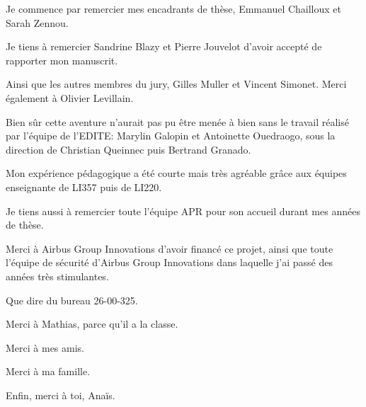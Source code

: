 

Je commence par remercier mes encadrants de thèse, Emmanuel Chailloux et Sarah
Zennou.


Je tiens à remercier Sandrine Blazy et Pierre Jouvelot d'avoir accepté de
rapporter mon manuscrit.


Ainsi que les autres membres du jury, Gilles Muller et Vincent Simonet.
Merci également à Olivier Levillain.


Bien sûr cette aventure n'aurait pas pu être menée à bien sans le travail
réalisé par l'équipe de l'EDITE: Marylin Galopin et Antoinette Ouedraogo, sous
la direction de Christian Queinnec puis Bertrand Granado.


Mon expérience pédagogique a été courte mais très agréable grâce aux équipes
enseignante de LI357 puis de LI220.


Je tiens aussi à remercier toute l'équipe APR pour son accueil durant mes années
de thèse.


Merci à Airbus Group Innovations d'avoir financé ce projet, ainsi que toute
l'équipe de sécurité d'Airbus Group Innovations dans laquelle j'ai passé des
années très stimulantes. 


Que dire du bureau 26-00-325.

Merci à Mathias, parce qu'il a la classe.


Merci à mes amis.


Merci à ma famille.


Enfin, merci à toi, Anaïs.
